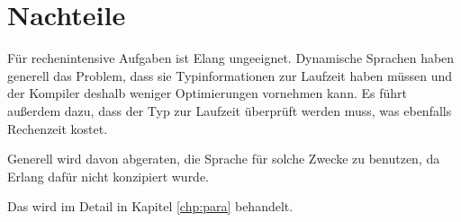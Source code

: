 \section{Nachteile}
Für rechenintensive Aufgaben ist Elang ungeeignet.  Dynamische
Sprachen haben generell das Problem, dass sie Typinformationen zur
Laufzeit haben müssen und der Kompiler deshalb weniger Optimierungen
vornehmen kann.  Es führt außerdem dazu, dass der Typ zur Laufzeit
überprüft werden muss, was ebenfalls Rechenzeit kostet.

Generell wird davon abgeraten, die Sprache für solche Zwecke zu
benutzen, da Erlang dafür nicht konzipiert wurde.
\cite[Kapitel~3]{lyse}

Das wird im Detail in Kapitel \ref{chp:para}
behandelt.
